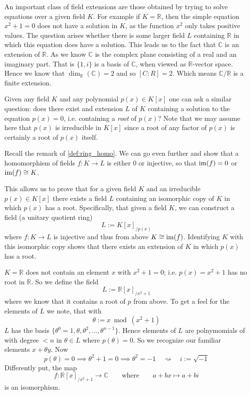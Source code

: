 \begin{example}
   An important class of field extensions are those obtained by trying to solve equations over a given field \(K\).
   For example if \(K = \mathbb{R}\), then the simple equation \(x^2 + 1 = 0\) does not have a solution in \(K\), as the function \(x^2\) only takes positive values.
   The question arises whether there is some larger field \(L\) containing \(\mathbb{R}\) in which this equation does have a solution.
   This leads us to the fact that \(\mathbb{C}\) is an extension of \(\mathbb{R}\).
   As we know \(\mathbb{C}\) is the complex plane consisting of a real and an imaginary part.
   That is \(\{1, i\}\) is a basis of \(\mathbb{C}\), when viewed as \(\mathbb{R}\)-vector space.
   Hence we know that \(\dim_\mathbb{R}(\mathbb{C}) = 2\) and so \([C:R] = 2\).
   Which means \(\mathbb{C}/\mathbb{R}\) is a finite extension.
\end{example}
Given any field \(K\) and any polynomial \(p(x) \in K[x]\) one can ask a similar question: does there exist and extension \(L\) of \(K\) containing a solution to the equation \(p(x) = 0\), i.e. containing a \emph{root} of \(p(x)\)?
Note that we may assume here that \(p(x)\) is irreducible in \(K[x]\) since a root of any factor of \(p(x)\) is certainly a root of \(p(x)\) itself.

Recall the remark of \cref{def:ring_homo}.
We can go even further and show that a homomorphism of fields \(f: K \to L\) is either 0 or injective, so that \(\operatorname{im}(f) = 0\) or \(\operatorname{im}(f) \cong K\).

This allows us to prove that for a given field \(K\) and an irreducible \(p(x) \in K[x]\) there exists a field \(L\) containing an isomorphic copy of \(K\) in which \(p(x)\) has a root.
Specifically, that given a field \(K\), we can construct a field (a unitary quotient ring)
\[L := K[x]_{/p(x)}\]
where \(f: K \to L\) is injective and thus from above \(K \cong \operatorname{im}(f)\).
Identifying \(K\) with this isomorphic copy shows that there exists an extension of \(K\) in which \(p(x)\) has a root.

\begin{example}
   \(K = \mathbb{R}\) does not contain an element \(x\) with \(x^2 + 1 = 0\); i.e. \(p(x) = x^2 + 1\) has no root in \(\mathbb{R}\).
   So we define the field
   \[L := \mathbb{R}[x]_{/x^2 + 1}\]
   where we know that it contains a root of \(p\) from above.
   To get a feel for the elements of \(L\) we note, that with
   \[\theta := x \bmod (x^2 + 1)\]
   \(L\) has the basis \(\{\theta^0 = 1, \theta, \theta^2, \ldots, \theta^{n-1}\}\).
   Hence elements of \(L\) are polnymomials of with degree \(< n\) in \(\theta \in L\) where \(p(\theta) = 0\).
   So we recognize our familiar elements \(x + \theta y\).
   Now
   \[p(\theta) = 0 \implies \theta^2 + 1 = 0 \implies \theta^2 = -1 \quad\rightsquigarrow\quad i := \sqrt{-1}\]
   Differently put, the map
   \[f: \mathbb{R}[x]_{/x^2 + 1} \to \mathbb{C} \qquad\text{where}\qquad a + bx \mapsto a+bi\]
   is an isomorphism.
\end{example}

